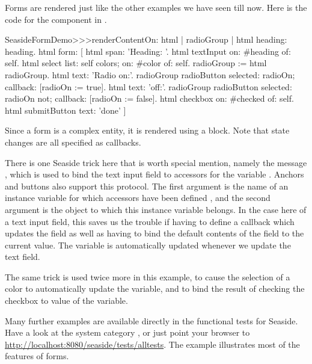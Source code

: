 \documentclass[a4paper,10pt,twoside]{book}
\begin{document}
Forms are rendered just like the other examples we have seen till now.
Here is the code for the  component in .

\begin{code}{}
SeasideFormDemo>>>renderContentOn: html
	| radioGroup |
	html heading: heading.
	html form: [
		html span: 'Heading: '.
		html textInput on: #heading of: self.
		html select
			list: self colors;
			on: #color of: self.
		radioGroup := html radioGroup.
		html text: 'Radio on:'.
		radioGroup radioButton
			selected: radioOn;
			callback: [radioOn := true].
		html text: 'off:'.
		radioGroup radioButton
			selected: radioOn not;
			callback: [radioOn := false].
		html checkbox on: #checked of: self.
		html submitButton
			text: 'done' ]
\end{code}{}

Since a form is a complex entity, it is rendered using a block. 
Note that state changes are all specified as callbacks.

There is one Seaside trick here that is worth special mention, namely the message , which is used to bind the text input field to accessors for the variable .
Anchors and buttons also support this protocol.
The first argument is the name of an instance variable for which accessors have been defined , and the second argument is the object to which this instance variable belongs.
In the case here of a text input field, this saves us the trouble if having to define a callback which updates the field as well as having to bind the default contents of the field to the current value.
The  variable is automatically updated whenever we update the text field.

The same trick is used twice more in this example, to cause the selection of a color to automatically update the  variable, and to bind the result of checking the checkbox to value of the  variable.

Many further examples are available directly in the functional tests for Seaside.
Have a look at the system category , or just point your browser to \url{http://localhost:8080/seaside/tests/alltests}.
The  example illustrates most of the features of forms.
\end{document}
